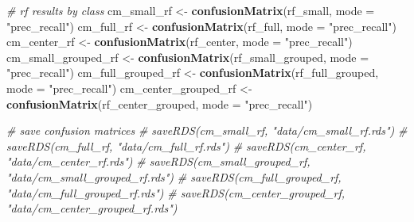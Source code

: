 \documentclass[12pt,twoside]{reedthesis}
\newenvironment{Shaded}{\begin{snugshade}}{\end{snugshade}}
\newcommand{\CommentTok}[1]{\textcolor[rgb]{0.56,0.35,0.01}{\textit{#1}}}
\newcommand{\DataTypeTok}[1]{\textcolor[rgb]{0.13,0.29,0.53}{#1}}
\newcommand{\KeywordTok}[1]{\textcolor[rgb]{0.13,0.29,0.53}{\textbf{#1}}}
\newcommand{\NormalTok}[1]{#1}
\newcommand{\StringTok}[1]{\textcolor[rgb]{0.31,0.60,0.02}{#1}}
\begin{document}
\begin{Shaded}
\begin{Highlighting}[]
\CommentTok{# rf results by class}
\NormalTok{cm_small_rf <-}\StringTok{ }\KeywordTok{confusionMatrix}\NormalTok{(rf_small,  }\DataTypeTok{mode =} \StringTok{"prec_recall"}\NormalTok{)}
\NormalTok{cm_full_rf <-}\StringTok{ }\KeywordTok{confusionMatrix}\NormalTok{(rf_full,  }\DataTypeTok{mode =} \StringTok{"prec_recall"}\NormalTok{)}
\NormalTok{cm_center_rf <-}\StringTok{ }\KeywordTok{confusionMatrix}\NormalTok{(rf_center,  }\DataTypeTok{mode =} \StringTok{"prec_recall"}\NormalTok{)}
\NormalTok{cm_small_grouped_rf <-}\StringTok{ }\KeywordTok{confusionMatrix}\NormalTok{(rf_small_grouped,  }\DataTypeTok{mode =} \StringTok{"prec_recall"}\NormalTok{)}
\NormalTok{cm_full_grouped_rf <-}\StringTok{ }\KeywordTok{confusionMatrix}\NormalTok{(rf_full_grouped,  }\DataTypeTok{mode =} \StringTok{"prec_recall"}\NormalTok{)}
\NormalTok{cm_center_grouped_rf <-}\StringTok{ }\KeywordTok{confusionMatrix}\NormalTok{(rf_center_grouped,  }\DataTypeTok{mode =} \StringTok{"prec_recall"}\NormalTok{)}

\CommentTok{# save confusion matrices}
\CommentTok{# saveRDS(cm_small_rf, "data/cm_small_rf.rds")}
\CommentTok{# saveRDS(cm_full_rf, "data/cm_full_rf.rds")}
\CommentTok{# saveRDS(cm_center_rf, "data/cm_center_rf.rds")}
\CommentTok{# saveRDS(cm_small_grouped_rf, "data/cm_small_grouped_rf.rds")}
\CommentTok{# saveRDS(cm_full_grouped_rf, "data/cm_full_grouped_rf.rds")}
\CommentTok{# saveRDS(cm_center_grouped_rf, "data/cm_center_grouped_rf.rds")}


\end{Highlighting}
\end{Shaded}
\end{document}
